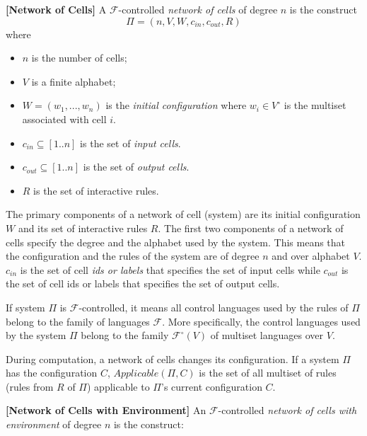 \documentclass[a4paper]{article}
\theoremstyle{definition}
\begin{document}

\label{def-nc} \textbf{[Network of Cells]} A $\mathscr{F}$-controlled \emph{network of 
cells} of degree $n$ is the construct $$\Pi = (n, V, W, c_{in}, c_{out}, R)$$ where

\begin{multicols}{2}
\begin{itemize}
\item $n$ is the number of cells; 
\item $V$ is a finite alphabet;
\item $W = (w_1,...,w_n)$ is the \emph{initial configuration} where $w_i \in V^{\circ}$ is the
      multiset associated with cell $i$.
\item $c_{in} \subseteq [1..n]$ is the set of \emph{input cells}.
\item $c_{out} \subseteq [1..n]$ is the set of \emph{output cells}.
\item $R$ is the set of interactive rules. 
\end{itemize}
\end{multicols}

The primary components of a network of cell (system) are its initial configuration $W$ and its set 
of interactive rules $R$. The first two components of a network of cells specify the degree and the 
alphabet used by the system. This means that the configuration and the rules of the system are of 
degree $n$ and over alphabet $V$. $c_{in}$ is the set of cell \emph{ids or labels} that specifies 
the set of input cells while $c_{out}$ is the set of cell ids or labels that specifies the set of 
output cells.

If system $\Pi$ is $\mathscr{F}$-controlled, it means all control languages used by the rules of
$\Pi$ belong to the family of languages $\mathscr{F}$. More specifically, the control languages used
by the system $\Pi$ belong to the family $\mathscr{F}^{\circ}(V)$ of multiset languages over $V$.

During computation, a network of cells changes its configuration. If a system $\Pi$ has the
configuration $C$, $Applicable(\Pi,C)$ is the set of all multiset of rules (rules from $R$ of $\Pi$) 
applicable to $\Pi$'s current configuration $C$.


\label{[def-nc2]}\textbf{[Network of Cells with Environment]} An 
$\mathscr{F}$-controlled \emph{network of cells with environment} of degree $n$ is the construct:
\end{document}
